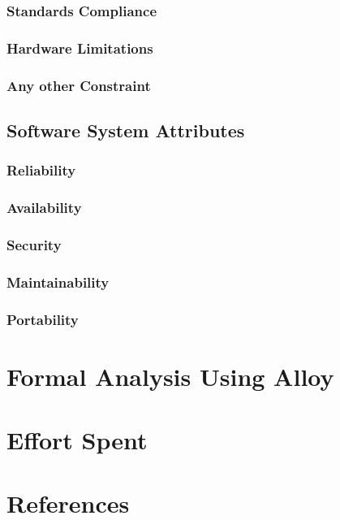 \documentclass[a4paper]{article}
\begin{document}
\subsubsection{Standards Compliance}

\subsubsection{Hardware Limitations}

\subsubsection{Any other Constraint}

\subsection{Software System Attributes}

\subsubsection{Reliability}

\subsubsection{Availability}

\subsubsection{Security}

\subsubsection{Maintainability}

\subsubsection{Portability}

\section{Formal Analysis Using Alloy}

\section{Effort Spent}

\section{References}
\end{document}
